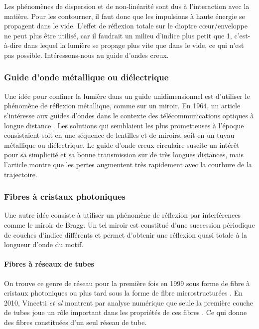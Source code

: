 Les phénomènes de dispersion et de non-linéarité sont dus à l'interaction avec la matière. Pour les contourner, il faut donc que les impulsions à haute énergie se propagent dans le vide. L'effet de réflexion totale sur le dioptre cœur/enveloppe ne peut plus être utilisé, car il faudrait un milieu d'indice plus petit que 1, c’est-à-dire dans lequel la lumière se propage plus vite que dans le vide, ce qui n'est pas possible. Intéressons-nous au guide d'ondes creux.

\subsubsection{Guide d'onde métallique ou diélectrique}

Une idée pour confiner la lumière dans un guide unidimensionnel est d'utiliser le phénomène de réflexion métallique, comme sur un miroir. En 1964, un article s'intéresse aux guides d'ondes dans le contexte des télécommunications optiques à longue distance \cite{marcatili_hollow_1964}. Les solutions qui semblaient les plus prometteuses à l'époque consistaient soit en une séquence de lentilles et de miroirs, soit en un tuyau métallique ou diélectrique. Le guide d'onde creux circulaire suscite un intérêt pour sa simplicité et sa bonne transmission sur de très longues distances, mais l'article montre que les pertes augmentent très rapidement avec la courbure de la trajectoire.

\subsubsection{Fibres à cristaux photoniques}

Une autre idée consiste à utiliser un phénomène de réflexion par interférences comme le miroir de Bragg. Un tel miroir est constitué d'une succession périodique de couches d'indice différents et permet d'obtenir une réflexion quasi totale à la longueur d'onde du motif. 

\paragraph{Fibres à réseaux de tubes}
On trouve ce genre de réseau pour la première fois en 1999 sous forme de fibre à cristaux photoniques \cite{cregan_single-mode_1999} ou plus tard sous la forme de fibre microstructurées \cite{argyros_hollow-core_2006}. En 2010, Vincetti \emph{et al} montrent par analyse numérique que seule la première couche de tubes joue un rôle important dans les propriétés de ces fibres \cite{vincetti_waveguiding_2010}. Ce qui donne des fibres constituées d'un seul réseau de tube.

